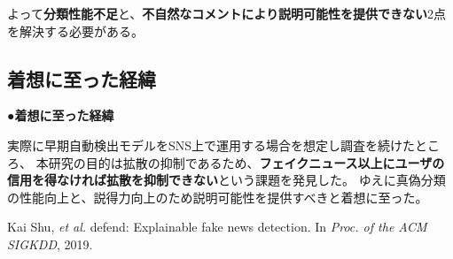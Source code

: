 {	よって\textbf{分類性能不足}と、\textbf{不自然なコメントにより説明可能性を提供できない}2点を解決する必要がある。

	\subsection{着想に至った経緯}
	\noindent
	●\textbf{着想に至った経緯}

	実際に早期自動検出モデルをSNS上で運用する場合を想定し調査を続けたところ、
	本研究の目的は拡散の抑制であるため、\textbf{フェイクニュース以上にユーザの信用を得なければ拡散を抑制できない}という課題を発見した。
	ゆえに真偽分類の性能向上と、説得力向上のため説明可能性を提供すべきと着想に至った。

	{\footnotesize
		\begin{thebibliography}{99}
			\vspace*{-1mm}
			\setlength{\parskip}{0cm}
			\setlength{\itemsep}{0cm}
			\setcounter{enumiv}{7}
			\begin{spacing}{0.7}
				 Kai Shu, \textit{et al.} defend: Explainable fake news detection. In \textit{Proc. of the ACM SIGKDD}, 2019.
			\end{spacing}
			\end{thebibliography}
			
	}
}

